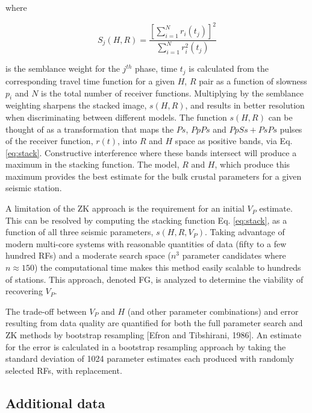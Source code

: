 \documentclass[draft, 12pt]{article}
\begin{document}
where

\begin{equation}
S_j(H,R) = \frac {\left[ \sum_{i=1}^N r_i(t_j) \right]^2}
                 { \sum_{i=1}^N r_i^2(t_j) }
\end{equation}

is the semblance weight for the $j^{th}$ phase, time $t_j$ is calculated from the corresponding travel time function for a given $H$, $R$ pair as a function of slowness $p_i$ and $N$ is the total number of receiver functions. Multiplying by the semblance weighting sharpens the stacked image, $s(H,R)$, and results in better resolution when discriminating between different models. The function $s(H,R)$ can be thought of as a transformation that maps the $Ps$, $PpPs$ and $PpSs+PsPs$ pulses of the receiver function, $r(t)$, into $R$ and $H$ space as positive bands, via Eq. \ref{eq:stack}. Constructive interference where these bands intersect will produce a maximum in the stacking function. The model, $R$ and $H$, which produce this maximum provides the best estimate for the bulk crustal parameters for a given seismic station.

A limitation of the ZK approach is the requirement for an initial $V_P$ estimate. This can be resolved by computing the stacking function Eq. \ref{eq:stack}, as a function of all three seismic parameters, $s(H,R,V_P)$. Taking advantage of modern multi-core systems with reasonable quantities of data (fifty to a few hundred RFs) and a moderate search space ($n^3$ parameter candidates where $n \approx 150$) the computational time makes this method easily scalable to hundreds of stations. This approach, denoted FG, is analyzed to determine the viability of recovering $V_P$.

The trade-off between $V_P$ and $H$ (and other parameter combinations) and error resulting from data quality are quantified for both the full parameter search and ZK methods by bootstrap resampling [Efron and Tibshirani, 1986]. An estimate for the error is calculated in a bootstrap resampling approach by taking the standard deviation of 1024 parameter estimates each produced with randomly selected RFs, with replacement.

\subsection{Additional data}
\end{document}
